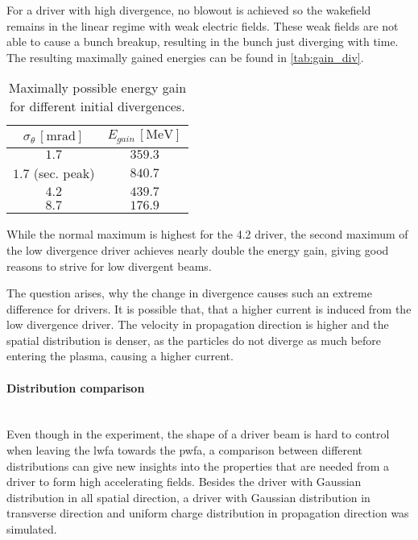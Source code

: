 \documentclass[bachelor_thesis]{subfiles}
\begin{document}
For a driver with high divergence, no blowout is achieved so the wakefield remains in the linear regime with weak electric fields. These weak fields are not able to cause a bunch breakup, resulting in the bunch just diverging with time.
The resulting maximally gained energies can be found in \autoref{tab:gain_div}.
\begin{table}[h]
\begin{center}
\begin{tabular}{|c|c|} 
	\hline
 	$\sigma_{\theta} \, \mathrm{[mrad]}$ & $E_{gain} \, \mathrm{[MeV]}$ \\ 
 	\hline
	$1.7$ & $359.3$ \\ 
	$1.7$ (sec. peak) & $840.7$ \\ 
 	$4.2$ & $439.7$ \\
	$8.7$ & $176.9$ \\
	\hline
\end{tabular}
\caption{Maximally possible energy gain for different initial divergences.}\label{tab:gain_div}
\end{center}
\end{table}
While the normal maximum is highest for the \qty{4.2}{\mrad} driver, the second maximum of the low divergence driver achieves nearly double the energy gain, giving good reasons to strive for low divergent beams.
 
The question arises, why the change in divergence causes such an extreme difference for drivers. It is possible that, that a higher current is induced from the low divergence driver. The velocity in propagation direction is higher and the spatial distribution
is denser, as the particles do not diverge as much before entering the plasma, causing a higher current. 


\paragraph*{Distribution comparison}\hspace{0pt} \\
Even though in the experiment, the shape of a driver beam is hard to control when leaving the \gls{lwfa} towards the \gls{pwfa}, a comparison between different distributions can give new insights into the properties that are needed from a driver
to form high accelerating fields. Besides the driver with Gaussian distribution in all spatial direction, a driver with Gaussian distribution in transverse direction and uniform charge distribution in propagation direction  was simulated.
\end{document}

